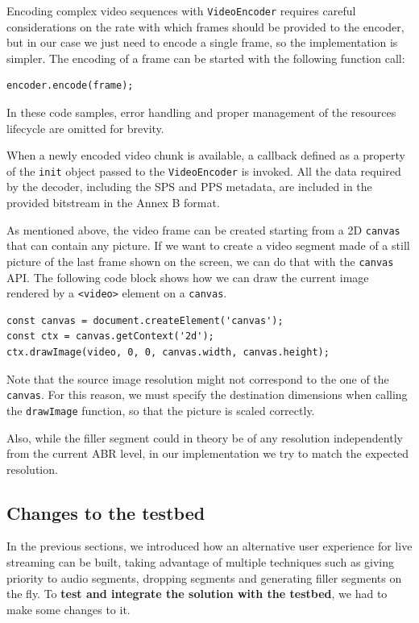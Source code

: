Encoding complex video sequences with \texttt{VideoEncoder} requires careful considerations on the rate with which frames should be provided to the encoder, but in our case we just need to encode a single frame, so the implementation is simpler. The encoding of a frame can be started with the following function call:

\begin{verbatim}
encoder.encode(frame);
\end{verbatim}

In these code samples, error handling and proper management of the resources lifecycle are omitted for brevity.

When a newly encoded video chunk is available, a callback defined as a property of the \texttt{init} object passed to the \texttt{VideoEncoder} is invoked. All the data required by the decoder, including the SPS and PPS metadata, are included in the provided bitstream in the Annex B format.

As mentioned above, the video frame can be created starting from a 2D \texttt{canvas} that can contain any picture. If we want to create a video segment made of a still picture of the last frame shown on the screen, we can do that with the \texttt{canvas} API. The following code block shows how we can draw the current image rendered by a \texttt{<video>} element on a \texttt{canvas}.

\begin{verbatim}
const canvas = document.createElement('canvas');
const ctx = canvas.getContext('2d');
ctx.drawImage(video, 0, 0, canvas.width, canvas.height);
\end{verbatim}

Note that the source image resolution might not correspond to the one of the \texttt{canvas}. For this reason, we must specify the destination dimensions when calling the \texttt{drawImage} function, so that the picture is scaled correctly.

Also, while the filler segment could 
in theory be of any resolution independently from the current ABR level, in our implementation we try to match the expected resolution.

\subsection{Changes to the testbed}
\label{sec:improvements/impl/newtestbed}

In the previous sections, we introduced how an alternative user experience for live streaming can be built, taking advantage of multiple techniques such as giving priority to audio segments, dropping segments and generating filler segments on the fly. To \textbf{test and integrate the solution with the testbed}, we had to make some changes to it.

